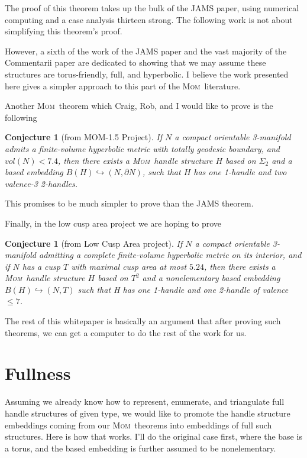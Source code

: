 \documentclass{article}
\theoremstyle{plain}
\newtheorem{conjecture}[theorem]{Conjecture}
\theoremstyle{plain}
\theoremstyle{definition}
\numberwithin{equation}{section}
\newcommand{\MOM}{\textsc{Mom}}
\begin{document}
The proof of this theorem takes up the bulk of the JAMS paper,
using numerical computing and a case analysis thirteen strong.
The following work is not about simplifying this theorem's proof.

However, a sixth of the work of the JAMS paper and the vast 
majority of the Commentarii paper are dedicated to showing that
we may assume these structures are torus-friendly, full,
and hyperbolic. I believe the work presented here gives a
simpler approach to this part of the \MOM\ literature.

Another \MOM\ theorem which Craig, Rob, and I would like
to prove is the following
\begin{conjecture}[from MOM-1.5 Project]
If $N$ a compact orientable 3-manifold
admits a finite-volume hyperbolic metric with totally geodesic
boundary, and $vol(N) < 7.4$, then there exists a \MOM\ handle
structure $H$ based on $\Sigma_2$ and a based embedding
$B(H) \hookrightarrow (N,\partial N)$, such that $H$
has one 1-handle and two valence-3 2-handles.
\end{conjecture}

This promises to be much simpler to prove than the JAMS theorem.

Finally, in the low cusp area project we are hoping to prove
\begin{conjecture}[from Low Cusp Area project]
If $N$ a compact orientable 3-manifold admitting a
complete finite-volume hyperbolic metric on its interior,
and if $N$ has a cusp $T$ with maximal cusp area at most
$5.24$, then there exists a \MOM\ handle structure $H$
based on $T^2$ and a nonelementary based embedding $B(H) \hookrightarrow (N,T)$
such that H has one 1-handle and one 2-handle of valence $\leq 7$.
\end{conjecture}

The rest of this whitepaper is basically an argument
that after proving such theorems, we can get a computer
to do the rest of the work for us.

\section{Fullness}
Assuming we already know how to represent, enumerate,
and triangulate full handle structures of given type,
we would like to promote the handle structure embeddings
coming from our \MOM\ theorems into embeddings of
full such structures. Here is how that works. I'll do
the original case first, where the base is a torus,
and the based embedding is further assumed to be nonelementary.
\end{document}
